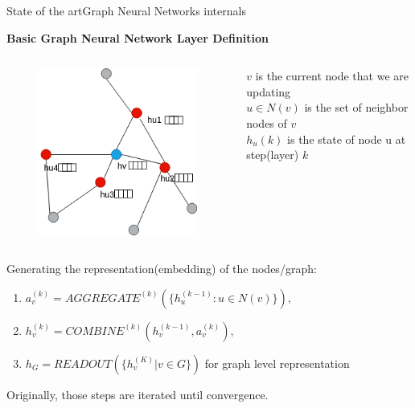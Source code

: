 \documentclass[xcolor=table]{beamer}
\begin{document}
\begin{frame}{State of the art}{Graph Neural Networks internals}

\textbf{Basic Graph Neural Network Layer Definition}

\begin{columns}
\begin{figure}
    \includegraphics[scale=0.35]{./img/GNN_internals_03.png}
\end{figure}


$ v $ is the current node that we are updating\\
$ u \in N(v)$ is the set of neighbor nodes of $v$\\
$h_u(k)$ is the state of node u at step(layer) $k$\\


\end{columns}

\vspace{20px}
Generating the representation(embedding) of the nodes/graph:

\begin{enumerate}
    \item $ a_v^{(k)} = AGGREGATE^{(k)}(\{ h_u^{(k-1)} : u \in N(v) \}) ,$
    \item $ h_v^{(k)} = COMBINE^{(k)}(h_v^{(k-1)}, a_v^{(k)}),$
    \item $ h_G = READOUT(\{h_v^{(K)} | v \in G\})$  for graph level representation
\end{enumerate}
\vspace{20px}
Originally, those steps are iterated until convergence.
\end{frame}
\end{document}
